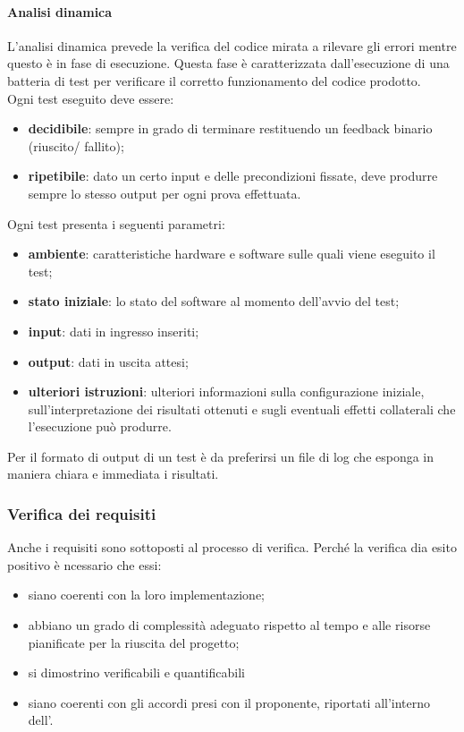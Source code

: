 \paragraph{Analisi dinamica}
L'analisi dinamica prevede la verifica del codice mirata a rilevare gli errori mentre questo è in fase di esecuzione.  Questa fase è caratterizzata dall'esecuzione di una batteria di test per verificare il corretto funzionamento del codice prodotto.\\
Ogni test eseguito deve essere:
\begin{itemize}
    \item \textbf{decidibile}: sempre in grado di terminare restituendo un feedback binario (riuscito/ fallito);
    \item \textbf{ripetibile}: dato un certo input e delle precondizioni fissate, deve produrre sempre lo stesso output per ogni prova effettuata.
\end{itemize} 
Ogni test presenta i seguenti parametri:
\begin{itemize}
    \item \textbf{ambiente}: caratteristiche hardware e software sulle quali viene eseguito il test;
    \item \textbf{stato iniziale}: lo stato del software al momento dell'avvio del test;
    \item \textbf{input}: dati in ingresso inseriti;
    \item \textbf{output}: dati in uscita attesi;
    \item \textbf{ulteriori istruzioni}: ulteriori informazioni sulla configurazione iniziale, sull'interpretazione dei risultati ottenuti e sugli eventuali effetti collaterali che l'esecuzione può produrre.
\end{itemize}
Per il formato di output di un test è da preferirsi un file di log che esponga in maniera chiara e immediata i risultati. 

\subsubsection{Verifica dei requisiti}
Anche i requisiti sono sottoposti al processo di verifica. Perché la verifica dia esito positivo è ncessario che essi:

\begin{itemize}
    \item siano coerenti con la loro implementazione;
    \item abbiano un grado di complessità adeguato rispetto al tempo e alle risorse pianificate per la riuscita del progetto;
    \item si dimostrino verificabili e quantificabili
    \item siano coerenti con gli accordi presi con il proponente, riportati all'interno dell'.
\end{itemize}


